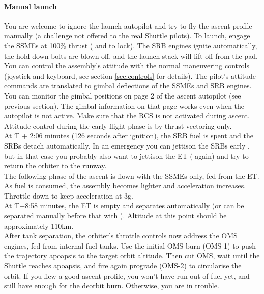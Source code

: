 \documentclass[Orbiter User Manual.tex]{subfiles}
\begin{document}
\paragraph{Manual launch}
You are welcome to ignore the launch autopilot and try to fly the ascent profile manually (a challenge not offered to the real Shuttle pilots). To launch, engage the SSMEs at 100\% thrust ( and  to lock). The SRB engines ignite automatically, the hold-down bolts are blown off, and the launch stack will lift off from the pad. You can control the assembly's attitude with the normal maneuvering controls (joystick and keyboard, see section \ref{sec:controls} for details). The pilot's attitude commands are translated to gimbal deflections of the SSMEs and SRB engines. You can monitor the gimbal positions on page 2 of the ascent autopilot (see previous section). The gimbal information on that page works even when the autopilot is not active. Make sure that the RCS is not activated during ascent. Attitude control during the early flight phase is by thrust-vectoring only.\\

At T + 2:06 minutes (126 seconds after ignition), the SRB fuel is spent and the SRBs detach automatically. In an emergency you can jettison the SRBs early , but in that case you probably also want to jettison the ET ( again) and try to return the orbiter to the runway.\\

The following phase of the ascent is flown with the SSMEs only, fed from the ET. As fuel is consumed, the assembly becomes lighter and acceleration increases. Throttle down to keep acceleration at 3g.\\

At T+8:58 minutes, the ET is empty and separates automatically (or can be separated manually before that with ). Altitude at this point should be approximately 110km.\\

After tank separation, the orbiter's throttle controls now address the OMS engines, fed from internal fuel tanks. Use the initial OMS burn (OMS-1) to push the trajectory apoapsis to the target orbit altitude. Then cut OMS, wait until the Shuttle reaches apoapsis, and fire again prograde (OMS-2) to circularise the orbit. If you flew a good ascent profile, you won't have run out of fuel yet, and still have enough for the deorbit burn. Otherwise, you are in trouble.\\
\end{document}
